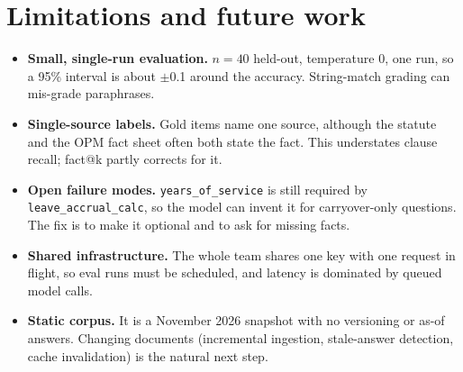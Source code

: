 \section{Limitations and future work}
\label{sec:limits}
\begin{itemize}
\item \textbf{Small, single-run evaluation.} $n{=}40$ held-out, temperature 0, one run, so a 95\% interval is about
$\pm$0.1 around the accuracy. String-match grading can mis-grade paraphrases.
\item \textbf{Single-source labels.} Gold items name one source, although the statute and the OPM fact sheet often
both state the fact. This understates clause recall; fact@k partly corrects for it.
\item \textbf{Open failure modes.} \texttt{years\_of\_service} is still required by \texttt{leave\_accrual\_calc}, so
the model can invent it for carryover-only questions. The fix is to make it optional and to ask for missing facts.
\item \textbf{Shared infrastructure.} The whole team shares one key with one request in flight, so eval runs must
be scheduled, and latency is dominated by queued model calls.
\item \textbf{Static corpus.} It is a November 2026 snapshot with no versioning or as-of answers. Changing
documents (incremental ingestion, stale-answer detection, cache invalidation) is the natural next step.
\end{itemize}
